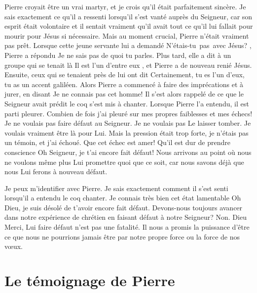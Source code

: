 Pierre croyait être un vrai martyr,
 et je crois qu'il était parfaitement sincère.
 Je sais exactement ce qu'il a ressenti lorsqu'il s'est vanté
 auprès du Seigneur, car son esprit était volontaire et il sentait
 vraiment qu'il avait tout ce qu'il lui fallait pour mourir pour Jésus
 si nécessaire. Mais au moment crucial, Pierre n'était vraiment pas prêt.
 Lorsque cette jeune servante lui a demandé\frcolon{}
 \Og N'étais-tu~pas~avec Jésus? \Fg{}, Pierre a répondu\frcolon{}
 \Og Je ne sais pas de quoi tu parles. \Fg{}
 Plus tard, elle a dit à un groupe qui se tenait là\frcolon{}
 \Og Il est l'un d'entre eux \Fg{}, et Pierre a de nouveau renié Jésus.
 Ensuite, ceux qui se tenaient près de lui ont dit\frcolon{}
 \Og Certainement, tu es l'un d'eux, tu as un accent galiléen. \Fg{}
 Alors Pierre a commencé à faire des imprécations et à jurer, en disant\frcolon{}
 \Og Je ne connais pas cet homme! \Fg{}
 Il s'est alors rappelé de ce que le Seigneur avait prédit\frcolon{}
 le coq s'est mis à chanter.
 Lorsque Pierre l'a entendu, il est parti pleurer.
 Combien de fois j'ai pleuré sur mes propres faiblesses
 et mes échecs! Je ne voulais pas faire défaut au Seigneur.
 Je ne voulais pas Le laisser tomber. Je voulais vraiment être là pour Lui.
 Mais la pression était trop forte, je n'étais pas un témoin,
 et j'ai échoué. Que cet échec est amer!
 Qu'il est dur de prendre conscience\frcolon{}
 \Og Oh Seigneur, je t'ai encore fait défaut! \Fg{}
 Nous arrivons au point où nous ne voulons même plus Lui promettre quoi
 que ce soit, car nous savons déjà que nous Lui ferons à nouveau défaut.

Je peux m'identifier avec Pierre.
 Je sais exactement comment il s'est senti lorsqu'il a entendu le coq chanter.
 Je connais très bien cet état lamentable\frcolon{}
 \Og Oh Dieu, je suis désolé de t'avoir encore fait défaut. \Fg{}
 Devons-nous toujours avancer dans notre expérience de chrétien
 en faisant défaut à notre Seigneur? Non.
 Dieu Merci, Lui faire défaut n'est pas une fatalité.
 Il nous a promis la puissance d'être ce que nous ne pourrions
 jamais être par notre propre force ou la force de nos vœux.


\section{Le t\'emoignage de Pierre}

